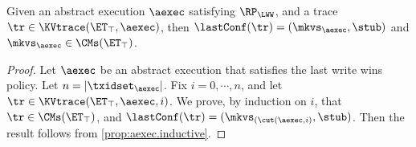 \begin{proposition}
\label{prop:aexec2kvtrace}
Given an abstract execution $\aexec$ satisfying $\RP_{\LWW}$, 
and a trace $\tr \in \KVtrace(\ET_{\top}, \aexec)$,
then $\lastConf(\tr) = (\mkvs_{\aexec}, \stub)$ and $\mkvs_{\aexec} \in \CMs(\ET_{\top})$. 
\end{proposition}
\begin{proof}
Let $\aexec$ be an abstract execution that satisfies the last write wins policy. 
Let $n = \lvert \txidset_{\aexec} \rvert$. Fix $i =0,\cdots, n$, 
and let $\tr \in \KVtrace(\ET_{\top}, \aexec, i)$. We prove, by 
induction on $i$, that $\tr \in \CMs(\ET_{\top})$, and 
$\lastConf(\tr) = (\mkvs_{(\cut(\aexec, i)}, \stub)$. 
Then the result follows from  \cref{prop:aexec.inductive}.


\end{proof}
